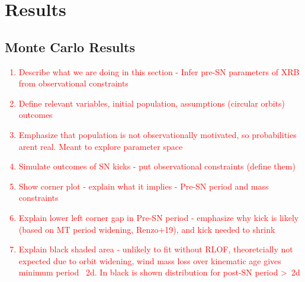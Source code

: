 \documentclass[linenumbers,trackchanges,twocolumn]{aastex701}
\newcommand{\red}{\textcolor{red}}
\begin{document}
\section{Results}

\subsection{Monte Carlo Results} \label{sec:monte_carlo}

\red{
\begin{enumerate}
    \item Describe what we are doing in this section - Infer pre-SN parameters of XRB from observational constraints
    \item Define relevant variables, initial population, assumptions (circular orbits) outcomes
    \item Emphasize that population is not observationally motivated, so probabilities arent real. Meant to explore parameter space
    \item Simulate outcomes of SN kicks - put observational constraints (define them)
    \item Show corner plot - explain what it implies - Pre-SN period and mass constraints
    \item Explain lower left corner gap in Pre-SN period - emphasize why kick is likely (based on MT period widening, Renzo+19), and kick needed to shrink
    \item Explain black shaded area - unlikely to fit without RLOF, theoretcially not expected due to orbit widening, wind mass loss over kinematic age gives minimum period ~2d. In black is shown distribution for post-SN period >~2d
\end{enumerate}
}
\end{document}
